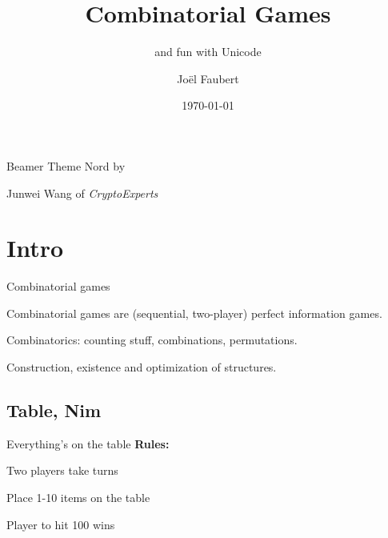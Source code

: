\documentclass[compress]{beamer}
\title{Combinatorial Games}
\subtitle{and fun with Unicode}
\author{Jo\"el Faubert}
\date{\today}
\newcommand{\blue}[1]{\textcolor{NordBlue}{#1}}
\newcommand{\red}[1]{\textcolor{NordRed}{#1}}
\newcommand{\yellow}[1]{\textcolor{NordYellow}{#1}}
\newcommand{\cyan}[1]{\textcolor{NordCyan}{#1}}
\newcommand{\bcyan}[1]{\textcolor{NordBrightCyan}{#1}}
\begin{document}
\begin{frame}

  \maketitle

  \vspace{10em}

Beamer Theme \bcyan{Nord} by

\blue{Junwei Wang} of {\it  CryptoExperts }
\end{frame}

\begin{frame}
    \tableofcontents
\end{frame}

\section{Intro}

\begin{frame}[fragile]{Combinatorial games}

\blue{Combinatorial games} are (sequential, two-player) perfect information games.

\bigskip

\blue{Combinatorics}: counting stuff, combinations, permutations.

\bigskip

\cyan{Construction}, \blue{existence} and \bcyan{optimization} of structures.

\bigskip

\begin{figure}
    \centering
{}
\end{figure}
\end{frame}

\subsection{Table, Nim}
\begin{frame}{Everything's on the table}
    \textbf{Rules:}
    \begin{description}
        \item \red{Two players} take turns
        \item Place \yellow{1-10} items on the table
        \item Player to hit \bcyan{100} wins
    \end{description}
\end{frame}
\end{document}
